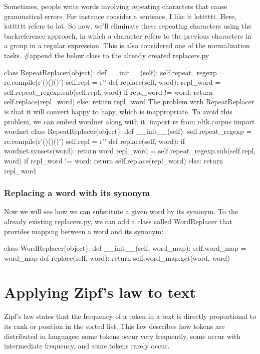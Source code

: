 \documentclass[11pt]{article}
\begin{document}
    Sometimes, people write words involving repeating characters that cause
grammatical errors. For instance consider a sentence, I like it
lotttttt. Here, lotttttt refers to lot. So now, we'll eliminate these
repeating characters using the backreference approach, in which a
character refers to the previous characters in a group in a regular
expression. This is also considered one of the normalization tasks.
#append the below class to the already created replacers.py

class RepeatReplacer(object):
    def __init__(self):
        self.repeat_regexp = re.compile(r'(\w*)(\w)\2(\w*)')
        self.repl = r'\1\2\3'
    def replace(self, word):
        repl_word = self.repeat_regexp.sub(self.repl, word)
        if repl_word != word:
            return self.replace(repl_word)
        else:
            return repl_word
    The problem with RepeatReplacer is that it will convert happy to hapy,
which is inappropriate. To avoid this problem, we can embed wordnet
along with it.
import re
from nltk.corpus import wordnet
class RepeatReplacer(object):
    def __init__(self):
        self.repeat_regexp = re.compile(r'(\w*)(\w)\2(\w*)')
        self.repl = r'\1\2\3'
    def replace(self, word):
        if wordnet.synsets(word):
            return word
    repl_word = self.repeat_regexp.sub(self.repl, word)
        if repl_word != word:
            return self.replace(repl_word)
        else:
            return repl_word
    \hypertarget{replacing-a-word-with-its-synonym}{%
\subsubsection{Replacing a word with its
synonym}\label{replacing-a-word-with-its-synonym}}
Now we will see how we can substitute a given word by its synonym. To the already
existing replacers.py, we can add a class called WordReplacer that provides
mapping between a word and its synonym:
    
    
class WordReplacer(object):
def __init__(self, word_map):
self.word_map = word_map
def replace(self, word):
return self.word_map.get(word, word)
    \hypertarget{applying-zipfs-law-to-text}{%
\section{Applying Zipf's law to text}\label{applying-zipfs-law-to-text}}

    Zipf's law states that the frequency of a token in a text is directly
proportional to its rank or position in the sorted list. This law
describes how tokens are distributed in languages: some tokens occur
very frequently, some occur with intermediate frequency, and some tokens
rarely occur.
\end{document}
